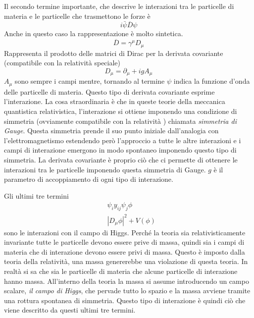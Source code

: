 Il secondo termine importante, che descrive le interazioni tra le particelle di materia e le particelle che trasmettono le forze è
\begin{equation}
i\bar{\psi}\overline{D}\psi
\end{equation} 
Anche in questo caso la rappresentazione è molto sintetica.
\begin{equation}
\overline{D}=\gamma^\mu D_\mu
\end{equation}
Rappresenta il prodotto delle matrici di Dirac per la derivata covariante (compatibile con la relatività speciale)
\begin{equation}
D_\mu=\partial_\mu +igA_\mu
\end{equation}
$A_\mu$ sono sempre i campi mentre, tornando al termine $\psi$ indica la funzione d'onda delle particelle di materia.
Questo tipo di derivata covariante esprime l'interazione.
La cosa straordinaria è che in queste teorie della meccanica quantistica relativistica, l'interazione si ottiene imponendo una condizione di simmetria (ovviamente compatibile con la relatività ) chiamata \emph{simmetria di Gauge}.
Questa simmetria prende il suo punto iniziale dall'analogia con l'elettromagnetismo estendendo però l'approccio a tutte le altre interazioni e i campi di interazione emergono in modo spontaneo imponendo questo tipo di simmetria.
La derivata covariante è proprio ciò che ci permette di ottenere le interazioni tra le particelle imponendo questa simmetria di Gauge.
$g$ è il parametro di accoppiamento di ogni tipo di interazione.

Gli ultimi tre termini
\begin{equation}
\begin{split}
&\psi_i y_{ij}\psi_j\phi\\
&|D_\mu\phi|^2+V(\phi)
\end{split}
\end{equation}
sono le interazioni con il campo di Higgs.
Perché la teoria sia relativisticamente invariante tutte le  particelle devono essere prive di massa, quindi sia i campi di materia che di interazione devono essere privi di massa.
Questo è imposto dalla teoria della relatività, una massa genererebbe una violazione di questa teoria.
In realtà si sa che sia le particelle di materia che alcune particelle di interazione hanno massa.
All'interno della teoria la massa si assume introducendo un campo scalare, \emph{il campo di Higgs}, che pervade tutto lo spazio e la massa avviene tramite una rottura spontanea di simmetria.
Questo tipo di interazione è quindi ciò che viene descritto da questi ultimi tre termini.

